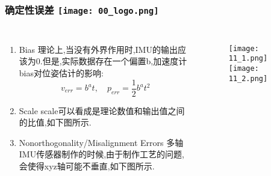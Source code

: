 \begin{frame}
  \frametitle{确定性误差 \hfill \texttt{[image: 00\_logo.png]}}
  \begin{columns}
    
    \begin{enumerate}
      \item Bias \quad 理论上,当没有外界作用时,IMU的输出应该为0.但是,实际数据存在一个偏置b,加速度计bias对位姿估计的影响:
      \begin{equation}
        v_{err} = b^a t,\quad p_{err} = \frac{1}{2} b^a t^2        
      \end{equation}

      \item Scale \quad scale可以看成是理论数值和输出值之间的比值,如下图所示.
      \item Nonorthogonality/Misalignment Errors \quad 
      多轴IMU传感器制作的时候,由于制作工艺的问题,会使得xyz轴可能不垂直,如下图所示.

    \end{enumerate}

    \begin{figure}[h]
      \texttt{[image: 11\_1.png]}
      \qquad
      \texttt{[image: 11\_2.png]}

    \end{figure}
    
  
  \end{columns}
  \end{frame}   

